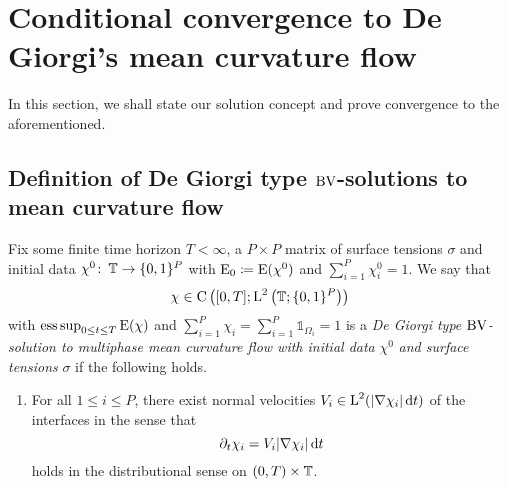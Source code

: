 \section{Conditional convergence to De Giorgi's mean curvature flow}

In this section, we shall state our solution concept and prove convergence to 
the aforementioned.

\subsection{Definition of De Giorgi type $ \operatorname{BV} $-solutions to mean curvature 
flow}

\begin{definition}
	\label{de_giorgi_solution_to_mmcf}
	Fix some finite time horizon $ T < \infty $, a $ P \times P $ matrix of 
	surface tensions $ \sigma $ and initial data $ \chi^{ 0 } \colon \operatorname{\mathbb{T}} 
	\to \{ 0 , 1 \}^{ P } $ with $ \operatorname{E}_{ 0 } \coloneqq \operatorname{E} ( \chi^{ 0 } 
	) $ and 
	$ \sum_{ i = 1 }^{ P } \chi_{ i }^{ 0 } = 1 $. We say that
	\begin{equation*}
		\chi \in \operatorname{C} \left(
		[ 0 , T ]
		;
		\operatorname{L}^{ 2 } \left( \operatorname{\mathbb{T}} ; \{ 0 , 1 \}^{ P } \right)
		\right)
	\end{equation*}
	with $ \operatorname*{ess\,sup}_{ 0 \leq t \leq T } \operatorname{E} ( \chi ) $ and $ \sum_{ i = 1 
	}^{ P } \chi_{ i } = \sum_{ i = 1 }^{ P } \mathds{ 1 }_{ \Omega_{ i } } = 
	1  $ is a \emph{ De Giorgi type }$\operatorname{BV}$\emph{-solution to multiphase mean 
	curvature flow with initial data} $ \chi^{ 0 } $ \emph{and surface 
	tensions} $ \sigma $ if the following holds. 
	\begin{enumerate}
		\item 
		For all $ 1 \leq i \leq P $, there exist normal 
		velocities $ V_{ i } \in \operatorname{L}^{ 2 } ( \abs{ \nabla \chi_{ i } } \dd{ t } 
		) $ 
		of the interfaces 
		in the sense that
		\begin{equation*}
			\partial_{ t } \chi_{ i }
			=
			V_{ i } \abs{ \nabla \chi_{ i } } \dd{ t }
		\end{equation*}
		holds in the distributional sense on $ ( 0 , T ) \times \operatorname{\mathbb{T}} $.
		

\end{enumerate}
\end{definition}
